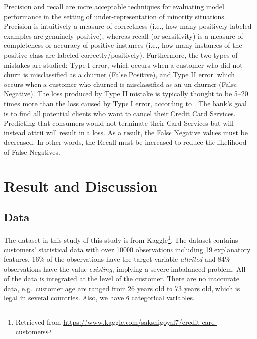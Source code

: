 Precision and recall are more acceptable techniques for evaluating model
performance in the setting of under-representation of minority
situations. Precision is intuitively a measure of correctness (i.e., how
many positively labeled examples are genuinely positive), whereas recall
(or sensitivity) is a measure of completeness or accuracy of positive
instances (i.e., how many instances of the positive class are labeled
correctly/positively). Furthermore, the two types of mistakes are
studied: Type I error, which occurs when a customer who did not churn is
misclassified as a churner (False Positive), and Type II error, which
occurs when a customer who churned is misclassified as an un-churner
(False Negative). The loss produced by Type II mistake is typically
thought to be 5--20 times more than the loss caused by Type I error,
according to \citet{Lee2006}. The bank's goal is to find all potential
clients who want to cancel their Credit Card Services. Predicting that
consumers would not terminate their Card Services but will instead
attrit will result in a loss. As a result, the False Negative values
must be decreased. In other words, the Recall must be increased to
reduce the likelihood of False Negatives.

\hypertarget{result-and-discussion}{%
\section{Result and Discussion}\label{result-and-discussion}}

\hypertarget{data}{%
\subsection{Data}\label{data}}

The dataset in this study of this study is from Kaggle\footnote{Retrieved
  from \url{https://www.kaggle.com/sakshigoyal7/credit-card-customers}}.
The dataset contains customers' statistical data with over 10000
observations including 19 explanatory features. 16\% of the observations
have the target variable \emph{attrited} and 84\% observations have the
value \emph{existing}, implying a severe imbalanced problem. All of the
data is integrated at the level of the customer. There are no inaccurate
data, e.g.~customer age are ranged from 26 years old to 73 years old,
which is legal in several countries. Also, we have 6 categorical
variables.

